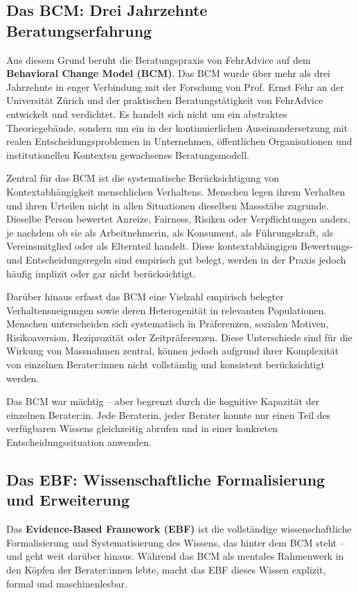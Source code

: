 \documentclass[11pt,a4paper]{article}
\begin{document}
\subsection{Das BCM: Drei Jahrzehnte Beratungserfahrung}

Aus diesem Grund beruht die Beratungspraxis von FehrAdvice auf dem \textbf{Behavioral Change Model (BCM)}. Das BCM wurde über mehr als drei Jahrzehnte in enger Verbindung mit der Forschung von Prof. Ernst Fehr an der Universität Zürich und der praktischen Beratungstätigkeit von FehrAdvice entwickelt und verdichtet. Es handelt sich nicht um ein abstraktes Theoriegebäude, sondern um ein in der kontinuierlichen Auseinandersetzung mit realen Entscheidungsproblemen in Unternehmen, öffentlichen Organisationen und institutionellen Kontexten gewachsenes Beratungsmodell.

Zentral für das BCM ist die systematische Berücksichtigung von Kontextabhängigkeit menschlichen Verhaltens. Menschen legen ihrem Verhalten und ihren Urteilen nicht in allen Situationen dieselben Massstäbe zugrunde. Dieselbe Person bewertet Anreize, Fairness, Risiken oder Verpflichtungen anders, je nachdem ob sie als Arbeitnehmerin, als Konsument, als Führungskraft, als Vereinsmitglied oder als Elternteil handelt. Diese kontextabhängigen Bewertungs- und Entscheidungsregeln sind empirisch gut belegt, werden in der Praxis jedoch häufig implizit oder gar nicht berücksichtigt.

Darüber hinaus erfasst das BCM eine Vielzahl empirisch belegter Verhaltensneigungen sowie deren Heterogenität in relevanten Populationen. Menschen unterscheiden sich systematisch in Präferenzen, sozialen Motiven, Risikoaversion, Reziprozität oder Zeitpräferenzen. Diese Unterschiede sind für die Wirkung von Massnahmen zentral, können jedoch aufgrund ihrer Komplexität von einzelnen Berater:innen nicht vollständig und konsistent berücksichtigt werden.

Das BCM war mächtig -- aber begrenzt durch die kognitive Kapazität der einzelnen Berater:in. Jede Beraterin, jeder Berater konnte nur einen Teil des verfügbaren Wissens gleichzeitig abrufen und in einer konkreten Entscheidungssituation anwenden.

\subsection{Das EBF: Wissenschaftliche Formalisierung und Erweiterung}

Das \textbf{Evidence-Based Framework (EBF)} ist die vollständige wissenschaftliche Formalisierung und Systematisierung des Wissens, das hinter dem BCM steht -- und geht weit darüber hinaus. Während das BCM als mentales Rahmenwerk in den Köpfen der Berater:innen lebte, macht das EBF dieses Wissen explizit, formal und maschinenlesbar.
\end{document}
